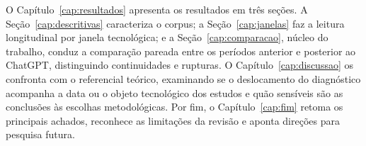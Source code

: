 O Capítulo~\ref{cap:resultados} apresenta os resultados em três seções. A Seção~\ref{cap:descritivas} caracteriza o corpus; a Seção~\ref{cap:janelas} faz a leitura longitudinal por janela tecnológica; e a Seção~\ref{cap:comparacao}, núcleo do trabalho, conduz a comparação pareada entre os períodos anterior e posterior ao ChatGPT, distinguindo continuidades e rupturas. 
O Capítulo~\ref{cap:discussao} os confronta com o referencial teórico, examinando se o deslocamento do diagnóstico acompanha a data ou o objeto tecnológico dos estudos e quão sensíveis são as conclusões às escolhas metodológicas. Por fim, o Capítulo~\ref{cap:fim} retoma os principais achados, reconhece as limitações da revisão e aponta direções para pesquisa futura.
